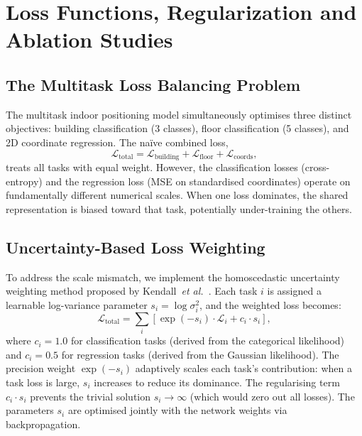 
\section{Loss Functions, Regularization and Ablation Studies}
\label{sec:loss-regularization}

\subsection{The Multitask Loss Balancing Problem}

The multitask indoor positioning model simultaneously optimises three distinct objectives: building classification (3 classes), floor classification (5 classes), and 2D coordinate regression. The na\"ive combined loss,
\begin{equation}
\mathcal{L}_{\text{total}} = \mathcal{L}_{\text{building}} + \mathcal{L}_{\text{floor}} + \mathcal{L}_{\text{coords}},
\label{eq:basic_loss}
\end{equation}
treats all tasks with equal weight. However, the classification losses (cross-entropy) and the regression loss (MSE on standardised coordinates) operate on fundamentally different numerical scales. When one loss dominates, the shared representation is biased toward that task, potentially under-training the others.

\subsection{Uncertainty-Based Loss Weighting}

To address the scale mismatch, we implement the homoscedastic uncertainty weighting method proposed by Kendall~\emph{et al.}~\cite{kendall2018multi}. Each task $i$ is assigned a learnable log-variance parameter $s_i = \log \sigma_i^2$, and the weighted loss becomes:
\begin{equation}
\mathcal{L}_{\text{total}} = \sum_{i} \left[ \exp(-s_i) \cdot \mathcal{L}_i + c_i \cdot s_i \right],
\label{eq:uncertainty_loss}
\end{equation}
where $c_i = 1.0$ for classification tasks (derived from the categorical likelihood) and $c_i = 0.5$ for regression tasks (derived from the Gaussian likelihood). The precision weight $\exp(-s_i)$ adaptively scales each task's contribution: when a task loss is large, $s_i$ increases to reduce its dominance. The regularising term $c_i \cdot s_i$ prevents the trivial solution $s_i \to \infty$ (which would zero out all losses). The parameters $s_i$ are optimised jointly with the network weights via backpropagation.

